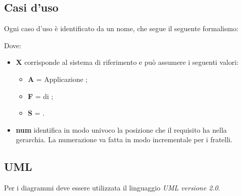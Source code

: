 \subsection{Casi d'uso}

Ogni caso d'uso è identificato da un nome, che segue il seguente formalismo:
\begin{center}
\end{center}

Dove: %
\begin{itemize}
 \item \textbf{X} corrisponde al sistema di riferimento e può assumere i seguenti valori:
	\begin{itemize}
	 \item[] \textbf{A} = Applicazione ;
	 \item[] \textbf{F} =  di ;
	 \item[] \textbf{S} = .
	\end{itemize}

 \item \textbf{num} identifica in modo univoco la posizione che il requisito ha nella gerarchia. La numerazione va fatta in modo incrementale per i fratelli. %
\end{itemize}

\subsection{UML}

Per i diagrammi deve essere utilizzata il linguaggio \emph{UML versione 2.0}.